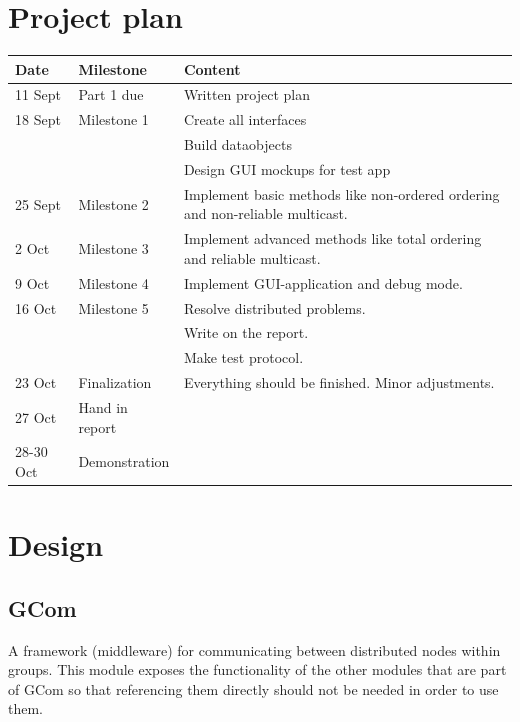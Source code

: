 \documentclass[english]{article}
\begin{document}
\section{Project plan}
\begin{tabular}{|l|l|l|}
\hline
Date	&	Milestone	&	Content \\
\hline
11 Sept	&	Part 1 due	&	Written project plan \\
18 Sept &	Milestone 1 &	Create all interfaces \\ 
						&&	Build dataobjects \\
						&&	Design GUI mockups for test app \\
25 Sept &	Milestone 2 & 	Implement basic methods like non-ordered ordering and non-reliable multicast. \\
2 Oct	&	Milestone 3 & 	Implement advanced methods like total ordering and reliable multicast. \\
9 Oct	&	Milestone 4 & 	Implement GUI-application and debug mode. \\
16 Oct	&	Milestone 5 & 	Resolve distributed problems. \\ && Write on the report.\\ && Make test protocol. \\
23 Oct	&	Finalization 	& Everything should be finished. Minor adjustments. \\
27 Oct	&	Hand in report 	& \\
28-30 Oct & Demonstration	& \\
\hline
\end{tabular}

\section{Design}



\subsection{GCom}
A framework (middleware) for communicating between distributed nodes within groups.
This module exposes the functionality of the other modules that are part of GCom so that referencing them directly should not be needed in order to use them.
\end{document}
